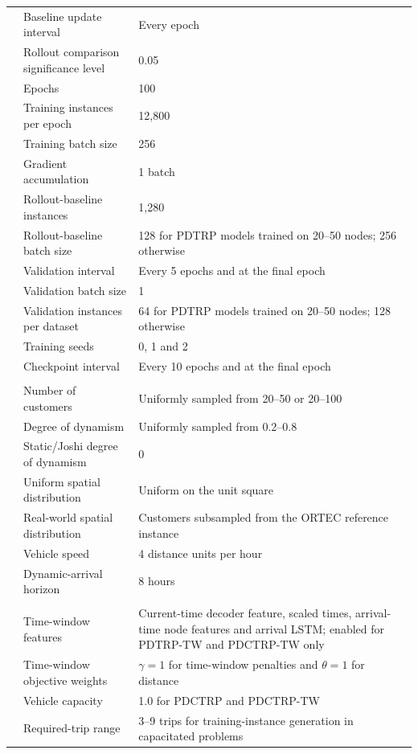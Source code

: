 \begin{longtable}{@{}p{}p{}p{}@{}}
& Baseline update interval & Every epoch \\
& Rollout comparison significance level & 0.05 \\
& Epochs & 100 \\
& Training instances per epoch & 12,800 \\
& Training batch size & 256 \\
& Gradient accumulation & 1 batch \\
& Rollout-baseline instances & 1,280 \\
& Rollout-baseline batch size &
128 for PDTRP models trained on 20--50 nodes; 256 otherwise \\
& Validation interval & Every 5 epochs and at the final epoch \\
& Validation batch size & 1 \\
& Validation instances per dataset &
64 for PDTRP models trained on 20--50 nodes; 128 otherwise \\
& Training seeds & 0, 1 and 2 \\
& Checkpoint interval & Every 10 epochs and at the final epoch \\
\addlinespace
\multicolumn{3}{@{}l}{\textit{Training-instance distribution}} \\
& Number of customers & Uniformly sampled from 20--50 or 20--100 \\
& Degree of dynamism & Uniformly sampled from $0.2$--$0.8$ \\
& Static/Joshi degree of dynamism & 0 \\
& Uniform spatial distribution & Uniform on the unit square \\
& Real-world spatial distribution &
Customers subsampled from the ORTEC reference instance \\
& Vehicle speed & 4 distance units per hour \\
& Dynamic-arrival horizon & 8 hours \\
\addlinespace
\multicolumn{3}{@{}l}{\textit{Problem-specific settings}} \\
& Time-window features &
Current-time decoder feature, scaled times, arrival-time node features and
arrival LSTM; enabled for PDTRP-TW and PDCTRP-TW only \\
& Time-window objective weights &
$\gamma=1$ for time-window penalties and $\theta=1$ for distance \\
& Vehicle capacity & 1.0 for PDCTRP and PDCTRP-TW \\
& Required-trip range &
3--9 trips for training-instance generation in capacitated problems \\
\end{longtable}
